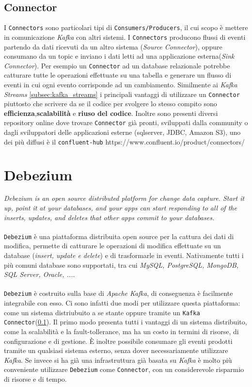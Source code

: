 \subsection{Connector}
\label{subsec:kafka_connectors}
I \texttt{Connectors} sono particolari tipi di \texttt{Consumers/Producers}, il cui scopo è mettere in comunicazione \textit{Kafka} con altri sistemi.
I \texttt{Connectors} producono flussi di eventi partendo da dati ricevuti da un altro sistema (\textit{Source Connector}), oppure consumano da un topic e inviano i dati letti ad una applicazione esterna(\textit{Sink Connector}).
Per esempio un \texttt{Connector} ad un database relazionale potrebbe catturare tutte le operazioni effettuate su una tabella e generare un flusso di eventi in cui ogni evento corrisponde ad un cambiamento.
Similmente ai \textit{Kafka Streams} \ref{subsec:kafka_streams} i principali vantaggi di utilizzare un \texttt{Connector} piuttosto che scrivere da se il codice per svolgere lo stesso compito sono
\textbf{efficienza},\textbf{scalabilità} e \textbf{riuso del codice}.
Inoltre sono presenti diversi repository online dove trovare \texttt{Connector} già pronti, sviluppati dalla community o dagli sviluppatori delle applicazioni esterne (sqlserver, JDBC, Amazon S3),
uno dei più diffusi è il \texttt{confluent-hub} https://www.confluent.io/product/connectors/ 

\newpage
\section{Debezium}
\label{sec:debezium_overview}
\textit{Debezium is an open source distributed platform for change data capture. Start it up, point it at your databases, and your apps can start responding to all of the inserts, updates, and deletes that other apps commit to your databases.}\cite*{debeziumwebsite}\\\\
\texttt{Debezium} è una piattaforma distribuita open source per la cattura dei dati di modifica, permette di catturare le operazioni di modifica effettuate su un database (\textit{insert, update e delete}) e di trasformarle in eventi.
Nativamente tutti i più comuni database sono supportati, tra cui \textit{MySQL, PostgreSQL, MongoDB, SQL Server, Oracle, ...}.\\\\
\texttt{Debezium} è costruito sulla base di \textit{Apache Kafka}, di conseguenza è facilmente integrabile con esso.
Ci sono infatti due modi per utilizzare questa piattaforma: come un sistema distriubuito a se stante oppure tramite un \texttt{Kafka Connector}(\ref{subsec:kafka_connectors}).
Il primo modo presenta tutti i vantaggi di un sistema distribuito, come la scalabilità e la fault-tollerance, ma ha un costo in termini di risorse, di configurazione e di gestione.
È inoltre possibile consumare gli eventi prodotti tramite un qualsiasi sistema esterno, senza dover necessariamente utilizzare \textit{Kafka}.
Se invece si ha già una infrastruttura già basata su \textit{Kafka} è molto più conveniente utilizzare \texttt{Debezium} come \texttt{Connector}, con un considerevole risparmio di risorse e di tempo.  


